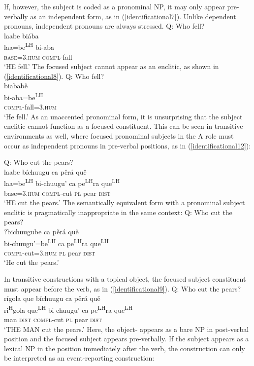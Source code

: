 If, however, the subject is coded as a pronominal NP, it may only appear pre-verbally as an independent form, as in (\ref{identificational7}). Unlike dependent pronouns, independent pronouns are always stressed.
\ea\label{identificational7}  
{Q: Who fell?} \\
\glll laabe bi\'{a}ba   \\
laa=be\textsuperscript{LH} bi-aba  \\
\textsc{base}=\textsc{3.hum} \textsc{compl}-fall  \\
\glt `HE fell.'
\z
The focused subject cannot appear as an enclitic, as shown in (\ref{identificational8}). 
\ea\label{identificational8}  
{Q: Who fell?} \\
\glll {\#}biabab\v{e}  \\
bi-aba=be\textsuperscript{LH}\\
\textsc{compl}-fall=\textsc{3.hum}  \\
\glt `He fell.'  
\z
As an unaccented pronominal form, it is unsurprising that the subject enclitic cannot function as a focused constituent. This can be seen in transitive environments as well, where focused pronominal subjects in the A role must occur as independent pronouns in pre-verbal positions, as in (\ref{identificational12}):

\ea\label{identificational12} 
{Q: Who cut the pears?} \\
\glll laabe b\'{i}chuugu ca p\v{e}r\'{a} qu\v{e}  \\
laa=be\textsuperscript{LH} bi-chuugu' ca pe\textsuperscript{LH}ra que\textsuperscript{LH}  \\
base=\textsc{3.hum} \textsc{compl}-cut \textsc{pl} pear \textsc{dist}  \\
\glt `HE cut the pears.'
\z
The semantically equivalent form with a pronominal subject enclitic is pragmatically inappropriate in the same context: 
\ea\label{identificational13}  
{Q: Who cut the pears?} \\
\glll ?bichuugube ca p\v{e}r\'{a} qu\v{e}  \\
bi-chuugu'=be\textsuperscript{LH} ca pe\textsuperscript{LH}ra que\textsuperscript{LH}  \\
\textsc{compl}-cut=\textsc{3.hum} \textsc{pl} pear \textsc{dist}  \\
\glt `He cut the pears.'
\z

In transitive constructions with a topical object, the focused subject constituent must appear before the verb, as in (\ref{identificational9}). 
\ea\label{identificational9}  
{Q: Who cut the pears?} \\
\glll r\'{i}gola que b\'{i}chuugu ca p\v{e}r\'{a} qu\v{e}  \\
ri\textsuperscript{H}gola que\textsuperscript{LH} bi-chuugu' ca pe\textsuperscript{LH}ra que\textsuperscript{LH}  \\
man \textsc{dist} \textsc{compl}-cut \textsc{pl} pear \textsc{dist}  \\
\glt `THE MAN cut the pears.'
\z
Here, the object- appears as a bare NP in post-verbal position and the focused subject appears pre-verbally. If the subject appears as a lexical NP in the position immediately after the verb, the construction can only be interpreted as an event-reporting construction:


